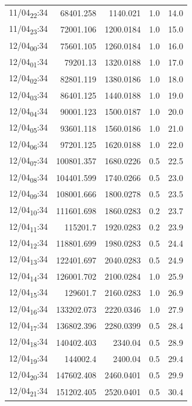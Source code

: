 \documentclass[11pt]{article}
\begin{document}
\begin{center}
\begin{tabular}{lrrrr}
11/04\textsubscript{22}:34 & 68401.258 & 1140.021 & 1.0 & 14.0\\[0pt]
11/04\textsubscript{23}:34 & 72001.106 & 1200.0184 & 1.0 & 15.0\\[0pt]
12/04\textsubscript{00}:34 & 75601.105 & 1260.0184 & 1.0 & 16.0\\[0pt]
12/04\textsubscript{01}:34 & 79201.13 & 1320.0188 & 1.0 & 17.0\\[0pt]
12/04\textsubscript{02}:34 & 82801.119 & 1380.0186 & 1.0 & 18.0\\[0pt]
12/04\textsubscript{03}:34 & 86401.125 & 1440.0188 & 1.0 & 19.0\\[0pt]
12/04\textsubscript{04}:34 & 90001.123 & 1500.0187 & 1.0 & 20.0\\[0pt]
12/04\textsubscript{05}:34 & 93601.118 & 1560.0186 & 1.0 & 21.0\\[0pt]
12/04\textsubscript{06}:34 & 97201.125 & 1620.0188 & 1.0 & 22.0\\[0pt]
12/04\textsubscript{07}:34 & 100801.357 & 1680.0226 & 0.5 & 22.5\\[0pt]
12/04\textsubscript{08}:34 & 104401.599 & 1740.0266 & 0.5 & 23.0\\[0pt]
12/04\textsubscript{09}:34 & 108001.666 & 1800.0278 & 0.5 & 23.5\\[0pt]
12/04\textsubscript{10}:34 & 111601.698 & 1860.0283 & 0.2 & 23.7\\[0pt]
12/04\textsubscript{11}:34 & 115201.7 & 1920.0283 & 0.2 & 23.9\\[0pt]
12/04\textsubscript{12}:34 & 118801.699 & 1980.0283 & 0.5 & 24.4\\[0pt]
12/04\textsubscript{13}:34 & 122401.697 & 2040.0283 & 0.5 & 24.9\\[0pt]
12/04\textsubscript{14}:34 & 126001.702 & 2100.0284 & 1.0 & 25.9\\[0pt]
12/04\textsubscript{15}:34 & 129601.7 & 2160.0283 & 1.0 & 26.9\\[0pt]
12/04\textsubscript{16}:34 & 133202.073 & 2220.0346 & 1.0 & 27.9\\[0pt]
12/04\textsubscript{17}:34 & 136802.396 & 2280.0399 & 0.5 & 28.4\\[0pt]
12/04\textsubscript{18}:34 & 140402.403 & 2340.04 & 0.5 & 28.9\\[0pt]
12/04\textsubscript{19}:34 & 144002.4 & 2400.04 & 0.5 & 29.4\\[0pt]
12/04\textsubscript{20}:34 & 147602.408 & 2460.0401 & 0.5 & 29.9\\[0pt]
12/04\textsubscript{21}:34 & 151202.405 & 2520.0401 & 0.5 & 30.4\\[0pt]

\end{tabular}
\end{center}
\end{document}

